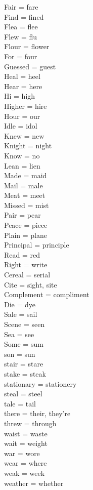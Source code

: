 \documentclass[12pt,a4paper]{article} %
\begin{document}
Fair = fare\\
Find = fined\\
Flea = flee\\
Flew = flu\\
Flour = flower\\
For = four\\
Guessed = guest\\
Heal = heel\\
Hear = here\\
Hi = high\\
Higher = hire\\
Hour = our\\
Idle = idol\\
Knew = new\\
Knight = night\\
Know = no\\
Lean = lien\\
Made = maid\\
Mail = male\\
Meat = meet\\
Missed = mist\\
Pair = pear\\
Peace = piece\\
Plain = plane\\
Principal = principle\\
Read = red\\
Right = write\\
Cereal = serial\\
Cite = sight, site\\
Complement = compliment\\
Die = dye\\
Sale = sail\\
Scene = seen\\
Sea = see\\
Some = sum\\
son = sun\\
stair = stare\\
stake = steak\\
stationary = stationery\\
steal = steel\\
tale = tail\\
there = their, they're\\
threw = through\\
waist = waste\\
wait = weight\\
war = wore\\
wear = where\\
weak = week\\
weather = whether\\
\end{document}
